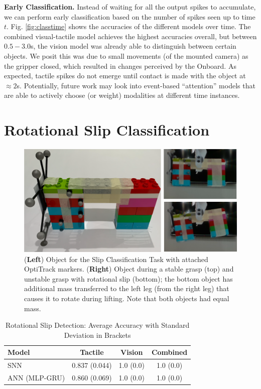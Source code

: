 \documentclass[fyp]{socreport}
\begin{document}
\noindent\textbf{Early Classification.} Instead of waiting for all the output
spikes to accumulate, we can perform early classification based on the number of
spikes seen up to time $t$. Fig. \ref{fig:classtime} shows the accuracies of the
different models over time. The combined visual-tactile model achieves the
highest accuracies overall, but between $0.5-3.0$s, the vision model was already
able to distinguish between certain objects. We posit this was due to small
movements (of the mounted camera) as the gripper closed, which resulted in
changes perceived by the Onboard. As expected, tactile spikes do not emerge
until contact is made with the object at $\approx 2$s. Potentially, future work
may look into event-based ``attention'' models that are able to actively choose
(or weight) modalities at different time instances.

\section{Rotational Slip Classification\label{sec:slippage}}

\begin{figure}
\centering
\includegraphics[width=0.65\columnwidth]{images/robotsetup/objects_exp2_small.png}
\caption{(\textbf{Left}) Object for the Slip Classification Task with attached
  OptiTrack markers. (\textbf{Right}) Object during a stable grasp (top) and
  unstable grasp with rotational slip (bottom); the bottom object has additional
  mass transferred to the left leg (from the right leg) that causes it to rotate
  during lifting. Note that both objects had equal
  mass.
}
\label{img:slips}
\end{figure}

\begin{table}
\centering
\caption{Rotational Slip Detection: Average Accuracy with Standard Deviation in Brackets}
\label{tbl:sdacc}
\begin{tabular}{l|ccc}
 \hline
 \hline
  \textbf{Model} & \textbf{Tactile} & \textbf{Vision} & \textbf{Combined} \\
  \hline
 SNN & 0.837 (0.044)  & 1.0 (0.0) & 1.0 (0.0) \\
 \hline
 ANN (MLP-GRU) & 0.860 (0.069) & 1.0 (0.0)  & 1.0 (0.0) \\
 \hline
 \hline
\end{tabular}
\end{table}
\end{document}
